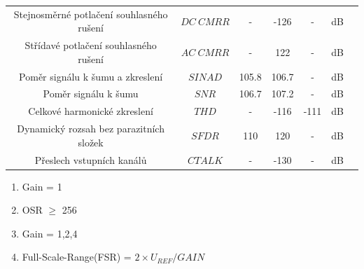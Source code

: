 \begin{table}[H]
\begin{ctucolortab}
\begin{tabular}{ccccccc}
            Stejnosměrné potlačení souhlasného rušení & $DC \ CMRR$                              & -                   & -126              & -                  & dB                                                & \\
            Střídavé potlačení souhlasného rušení     & $AC \ CMRR$                              & -                   & 122               & -                  & dB                                                & \\
            Poměr signálu k šumu a zkreslení          & $SINAD$                                  & 105.8               & 106.7             & -                  & dB                                                & \\
            Poměr signálu k šumu                      & $SNR$                                    & 106.7               & 107.2             & -                  & dB                                                & \\
            Celkové harmonické zkreslení              & $THD$                                    & -                   & -116              & -111               & dB                                                & \\
            Dynamický rozsah bez parazitních složek   & $SFDR$                                   & 110                 & 120               & -                  & dB                                                & \\
            Přeslech vstupních kanálů                 & $CTALK$                                  & -                   & -130              & -                  & dB                                                & \\
            \bottomrule
        \end{tabular}
    \end{ctucolortab}
    \begin{enumerate}
        \item Gain = 1 \label{enum:mcp_gain_one}
        \item OSR $\geq$ 256 \label{enum:mcp_accuracy}
        \item Gain = 1,2,4 \label{enum:mcp_drift}
        \item Full-Scale-Range(FSR) = $2 \times U_{REF}/GAIN$ \label{enum:mcp_adc_fsr}
    \end{enumerate}
\end{table}



